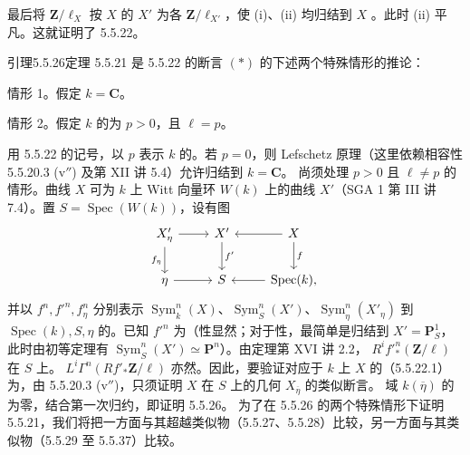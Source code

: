 最后将 $\mathbf Z/\ell_X$ 按 $X$ 的 $X'$ 为各 $\mathbf Z/\ell_{X'}$，使 (i)、(ii) 均归结到 $X$ 。此时 (ii) 平凡。这就证明了 5.5.22。
\begin{SGAresult}{引理}{5.5.26}定理 5.5.21 是 5.5.22 的断言 $(*)$ 的下述两个特殊情形的推论：

情形 1。假定 $k=\mathbf C$。

情形 2。假定 $k$ 的为 $p>0$，且 $\ell=p$。
\end{SGAresult}
用 5.5.22 的记号，以 $p$ 表示 $k$ 的。若 $p=0$，则 Lefschetz 原理（这里依赖相容性 5.5.20.3 (v$''$) 及第 XII 讲 5.4）允许归结到 $k=\mathbf C$。
尚须处理 $p>0$ 且 $\ell\ne p$ 的情形。曲线 $X$ 可为 $k$ 上 Witt 向量环 $W(k)$ 上的曲线 $X'$（SGA 1 第 III 讲 7.4）。置 $S=\operatorname{Spec}(W(k))$，设有图
\[\begin{tikzcd}
X'_\eta\arrow[r]\arrow[d,"f_\eta"']&X'\arrow[d,"f'"]&X\arrow[l]\arrow[d,"f"]\\
\eta\arrow[r]&S&\operatorname{Spec}(k)\arrow[l],
\end{tikzcd}\]
并以 $f^n,f'^n,f^n_\eta$ 分别表示 $\operatorname{Sym}^n_k(X)$、$\operatorname{Sym}^n_S(X')$、$\operatorname{Sym}^n_\eta(X'_\eta)$ 到 $\operatorname{Spec}(k),S,\eta$ 的。已知 $f'^n$ 为（性显然；对于性，最简单是归结到 $X'=\mathbf P^1_S$，此时由初等定理有 $\operatorname{Sym}^n_S(X')\simeq\mathbf P^n$）。由定理第 XVI 讲 2.2， $R^if'^n_*(\mathbf Z/\ell)$ 在 $S$ 上。 $L^i\Gamma^n(Rf'_*\mathbf Z/\ell)$ 亦然。因此，要验证对应于 $k$ 上 $X$ 的（5.5.22.1）为，由 5.5.20.3 (v$''$)，只须证明 $X$ 在 $S$ 上的几何 $X_{\overline\eta}$ 的类似断言。
域 $k(\overline\eta)$ 的为零，结合第一次归约，即证明 5.5.26。
为了在 5.5.26 的两个特殊情形下证明 5.5.21，我们将把一方面与其超越类似物（5.5.27、5.5.28）比较，另一方面与其类似物（5.5.29 至 5.5.37）比较。

